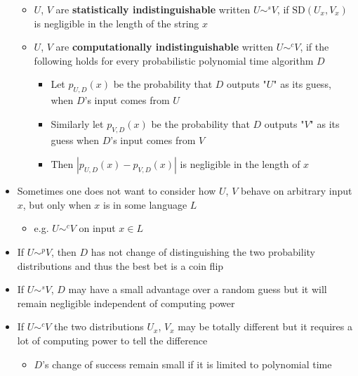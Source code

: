 \begin{itemize}
\begin{itemize}
  	\item $U$, $V$ are \textbf{statistically indistinguishable} written $U \sim^s V$, if $\text{SD}(U_x,V_x)$ is negligible in the length of the string $x$
  	\item $U$, $V$ are \textbf{computationally indistinguishable} written $U \sim^c V$, if the following holds for every probabilistic polynomial time algorithm $D$
    \begin{itemize}
  		\item Let $p_{U,D}(x)$ be the probability that $D$ outputs "$U$" as its guess, when $D$'s input comes from $U$
  		\item Similarly let $p_{V,D}(x)$ be the probability that $D$ outputs "$V$" as its guess when $D$'s input comes from $V$
  		\item Then $|p_{U,D}(x) - p_{V,D}(x)|$ is negligible in the length of $x$
    \end{itemize}
  \end{itemize}

  \item Sometimes one does not want to consider how $U$, $V$ behave on arbitrary input $x$, but only when $x$ is in some language $L$
  \begin{itemize}
  	\item e.g. $U \sim ^c V$ on input $x \in L$
  \end{itemize}
  \item If $U \sim ^p V$, then $D$ has not change of distinguishing the two probability distributions and thus the best bet is a coin flip
  \item If $U \sim^s V$, $D$ may have a small advantage over a random guess but it will remain negligible independent of computing power
  \item If $U \sim^c V$ the two distributions $U_x$, $V_x$ may be totally different but it requires a lot of computing power to tell the difference
  \begin{itemize}
	\item $D$'s change of success remain small if it is limited to polynomial time
  \end{itemize}
\end{itemize}

